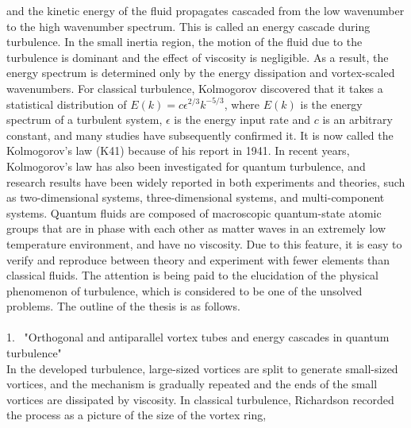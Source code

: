\documentclass[12pt,a4paper]{jbook}
\begin{document}
    and the kinetic energy of the fluid propagates cascaded from the low wavenumber to the high wavenumber spectrum. 
    This is called an energy cascade during turbulence. 
    In the small inertia region,
    the motion of the fluid due to the turbulence is dominant and the effect of viscosity is negligible. 
    As a result,
    the energy spectrum is determined only by the energy dissipation and vortex-scaled wavenumbers. 
    For classical turbulence,
    Kolmogorov discovered that it takes a statistical distribution of $E(k)=c\epsilon^{2/3}k^{-5/3}$,
    where $E(k)$ is the energy spectrum of a turbulent system, $\epsilon$ is the energy input rate and $c$ is an arbitrary constant,
    and many studies have subsequently confirmed it. 
    It is now called the Kolmogorov's law (K41) because of his report in 1941. 
    In recent years, Kolmogorov's law has also been investigated for quantum turbulence,
    and research results have been widely reported in both experiments and theories,
    such as two-dimensional systems,
    three-dimensional systems, and multi-component systems. 
    Quantum fluids are composed of macroscopic quantum-state atomic groups 
    that are in phase with each other as matter waves in an extremely low temperature environment,
    and have no viscosity. 
    Due to this feature,
    it is easy to verify and reproduce between theory and experiment with fewer elements than classical fluids.
    The attention is being paid to the elucidation of the physical phenomenon of turbulence,
    which is considered to be one of the unsolved problems. 
    The outline of the thesis is as follows. 
	\\
	\\
    1. \ "Orthogonal and antiparallel vortex tubes and energy cascades in quantum turbulence"
    \\
    In the developed turbulence,
    large-sized vortices are split to generate small-sized vortices,
    and the mechanism is gradually repeated and the ends of the small vortices are dissipated by viscosity.
    In classical turbulence,
    Richardson recorded the process as a picture of the size of the vortex ring,
\end{document}
